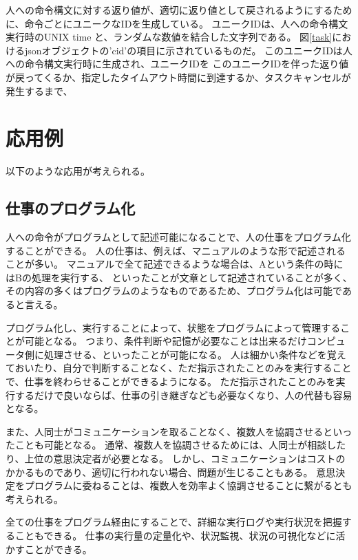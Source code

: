 人への命令構文に対する返り値が、適切に返り値として戻されるようにするために、命令ごとにユニークなIDを生成している。
ユニークIDは、人への命令構文実行時のUNIX time
と、ランダムな数値を結合した文字列である。
図\ref{task}におけるjsonオブジェクトの'cid'の項目に示されているものだ。
このユニークIDは人への命令構文実行時に生成され、ユニークIDを
このユニークIDを伴った返り値が戻ってくるか、指定したタイムアウト時間に到達するか、タスクキャンセルが発生するまで、

\section{応用例}\label{ux5fdcux7528ux4f8b}

以下のような応用が考えられる。

\subsection{仕事のプログラム化}\label{ux4ed5ux4e8bux306eux30d7ux30edux30b0ux30e9ux30e0ux5316}

人への命令がプログラムとして記述可能になることで、人の仕事をプログラム化することができる。
人の仕事は、例えば、マニュアルのような形で記述されることが多い。
マニュアルで全て記述できるような場合は、Aという条件の時にはBの処理を実行する、
といったことが文章として記述されていることが多く、その内容の多くはプログラムのようなものであるため、プログラム化は可能であると言える。

プログラム化し、実行することによって、状態をプログラムによって管理することが可能となる。
つまり、条件判断や記憶が必要なことは出来るだけコンピュータ側に処理させる、といったことが可能になる。
人は細かい条件などを覚えておいたり、自分で判断することなく、ただ指示されたことのみを実行することで、仕事を終わらせることができるようになる。
ただ指示されたことのみを実行するだけで良いならば、仕事の引き継ぎなども必要なくなり、人の代替も容易となる。

また、人同士がコミュニケーションを取ることなく、複数人を協調させるといったことも可能となる。
通常、複数人を協調させるためには、人同士が相談したり、上位の意思決定者が必要となる。
しかし、コミュニケーションはコストのかかるものであり、適切に行われない場合、問題が生じることもある。
意思決定をプログラムに委ねることは、複数人を効率よく協調させることに繋がるとも考えられる。

全ての仕事をプログラム経由にすることで、詳細な実行ログや実行状況を把握することもできる。
仕事の実行量の定量化や、状況監視、状況の可視化などに活かすことができる。

